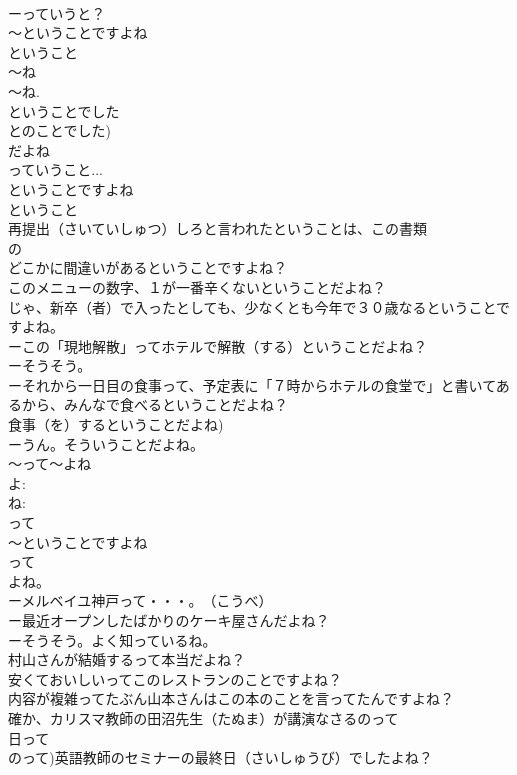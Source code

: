 \documentclass[8pt]{extreport}
\begin{document}
\begin{CJK}{UTF8}{min}
\\	ーっていうと？
\\	～ということですよね
\\	ということ 
\\	～ね
\\	～ね. 
\\	ということでした 
\\	とのことでした)
\\	だよね 
\\	っていうこと...
\\	ということですよね 
\\	ということ 
\\	再提出（さいていしゅつ）しろと言われたということは、この書類
\\	の
\\	どこかに間違いがあるということですよね？
\\	このメニューの数字、１が一番辛くないということだよね？
\\	じゃ、新卒（者）で入ったとしても、少なくとも今年で３０歳なるということですよね。
\\	ーこの「現地解散」ってホテルで解散（する）ということだよね？
\\	ーそうそう。
\\	ーそれから一日目の食事って、予定表に「７時からホテルの食堂で」と書いてあるから、みんなで食べるということだよね？ 
\\	食事（を）するということだよね)
\\	ーうん。そういうことだよね。
\\	～って～よね
\\	よ:
\\	ね:
\\	って 
\\	～ということですよね 
\\	って
\\	よね。 
\\	ーメルベイユ神戸って・・・。　（こうべ）
\\	ー最近オープンしたばかりのケーキ屋さんだよね？
\\	ーそうそう。よく知っているね。
\\	村山さんが結婚するって本当だよね？
\\	安くておいしいってこのレストランのことですよね？
\\	内容が複雑ってたぶん山本さんはこの本のことを言ってたんですよね？
\\	確か、カリスマ教師の田沼先生（たぬま）が講演なさるのって
\\	日って 
\\	のって)英語教師のセミナーの最終日（さいしゅうび）でしたよね？

\end{CJK}
\end{document}
